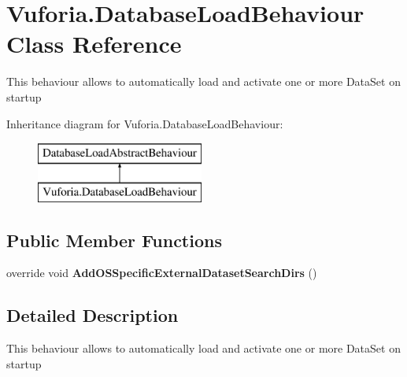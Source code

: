 \hypertarget{class_vuforia_1_1_database_load_behaviour}{}\section{Vuforia.\+Database\+Load\+Behaviour Class Reference}
\label{class_vuforia_1_1_database_load_behaviour}


This behaviour allows to automatically load and activate one or more Data\+Set on startup  


Inheritance diagram for Vuforia.\+Database\+Load\+Behaviour\+:\begin{figure}[H]
\begin{center}
\leavevmode
\includegraphics[height=2.000000cm]{class_vuforia_1_1_database_load_behaviour}
\end{center}
\end{figure}
\subsection*{Public Member Functions}
\begin{DoxyCompactItemize}
\item 
\hypertarget{class_vuforia_1_1_database_load_behaviour_ac9ac5f49c0b6948fcfc2c26f437b55b0}{}override void {\bfseries Add\+O\+S\+Specific\+External\+Dataset\+Search\+Dirs} ()\label{class_vuforia_1_1_database_load_behaviour_ac9ac5f49c0b6948fcfc2c26f437b55b0}

\end{DoxyCompactItemize}


\subsection{Detailed Description}
This behaviour allows to automatically load and activate one or more Data\+Set on startup 

